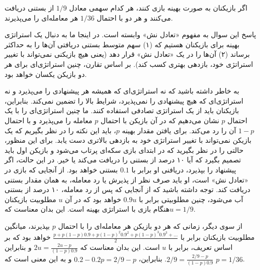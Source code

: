 \begin{solution}
اگر بازیکنان به صورت بهینه بازی کنند، هر کدام سهمی معادل $1/9$ از بستنی دریافت می‌کنند و هر دو با احتمال $1/36$ هر معامله‌ای را می‌پذیرند.

پاسخ این سوال به مفهوم «تعادل نش» وابسته است. در اینجا ما به دنبال یک استراتژی بهینه برای بازیکنان هستیم که (۱) سهم متوسط بستنی دریافتی آن‌ها را به حداکثر برساند (۲) آن‌ها را در یک «تعادل نش» قرار دهد (یعنی هیچ بازیکنی نمی‌تواند با تغییر استراتژی خود، بازدهی بهتری کسب کند). بر اساس تقارن، چنین استراتژی‌ای برای هر دو بازیکن یکسان خواهد بود.

به خاطر داشته باشید که نه استراتژی‌ای که همیشه هر پیشنهادی را می‌پذیرد و نه استراتژی‌ای که هیچ پیشنهادی را نمی‌پذیرد، شرایط بالا را تضمین نمی‌کند. بنابراین، بازیکنان باید از یک استراتژی تصادفی استفاده کنند. ما چنین استراتژی‌ای را با یک احتمال $p$ نشان می‌دهیم که در آن بازیکن با احتمال $p$ معامله را می‌پذیرد و با احتمال $1-p$ آن را رد می‌کند. برای یافتن مقدار بهینه $p$، باید این نکته را در نظر بگیریم که یک بازیکن نمی‌تواند با تغییر استراتژی خود به بازدهی بالاتری دست یابد. برای این منظور،  حالتی را در نظر بگیرید که در ابتدای بازی سکه‌ای پرتاب می‌شود و بازیکن اول باید تصمیم بگیرد که آیا ۱۰ درصد از بستنی را دریافت می‌کند یا خیر. در این حالت، اگر پیشنهاد را بپذیرد، دریافنی او برابر با $0.1$ بستنی خواهد بود. از آنجایی که بازی در «تعادل نش» است، او باید صرف نظر از پذیرش یا رد معامله، به همان مقدار بستنی دریافت کند. توجه داشته باشید که از آنجایی که پس از رد معامله، ۱۰ درصد از بستنی آب می‌شود، چنین مطلوبیتی برابر با $0.9 u$ خواهد بود که در آن $u$ مطلوبیت بازیکنان هنگام بازی با استراتژی بهینه است. این بدان معناست که$u=1/9‏$‎.

از سوی دیگر، زمانی که هر دو بازیکن هر معامله‌ای را با احتمال $p$ بپذیرند، میانگین مطلوبیت بازیکنان برابر با $\frac{p + p(1-p)  0.9 + p(1-p)^2 0.9^2 + p(1-p)^3 0.9^3 + \ldots}{2}$ خواهد بود که بر اساس تعریف، برابر با $u$ است. این بدان معناست که $2u = \frac{2u-p}{(1-p)0.9}$ و بنابراین $2/9 = \frac{2/9 - p}{(1-p)0.9}$. بنابراین، $0.2 - 0.2 p = 2/9 - p$ و به این معنی است که $p = 1/36$.


\end{solution}
